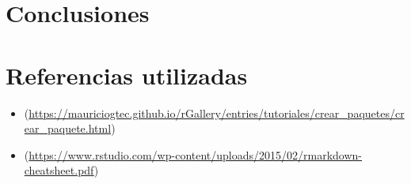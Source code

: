 \documentclass[]{article}
\providecommand{\tightlist}{%
  \setlength{\itemsep}{0pt}\setlength{\parskip}{0pt}}
\begin{document}
\section{Conclusiones}\label{conclusiones}

\section{Referencias utilizadas}\label{referencias-utilizadas}

\begin{itemize}
\tightlist
\item
  (\url{https://mauriciogtec.github.io/rGallery/entries/tutoriales/crear_paquetes/crear_paquete.html})
\item
  (\url{https://www.rstudio.com/wp-content/uploads/2015/02/rmarkdown-cheatsheet.pdf})
\end{itemize}
\end{document}
